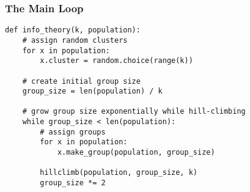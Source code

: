 \documentclass{beamer}
\begin{document}
\begin{frame}[fragile]
\frametitle{The Main Loop}
\begin{verbatim}
def info_theory(k, population):
    # assign random clusters
    for x in population:
        x.cluster = random.choice(range(k))

    # create initial group size
    group_size = len(population) / k
   
    # grow group size exponentially while hill-climbing
    while group_size < len(population):
        # assign groups
        for x in population:
            x.make_group(population, group_size)

        hillclimb(population, group_size, k)
        group_size *= 2
\end{verbatim}
\end{frame}

\frame{\tableofcontents}

\frame{\titlepage}
\end{document}
